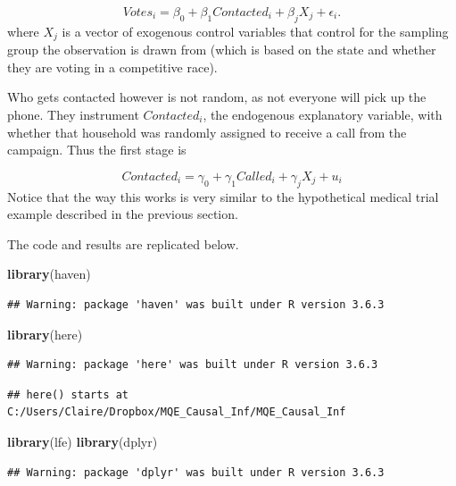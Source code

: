\documentclass[
]{article}
\newenvironment{Shaded}{\begin{snugshade}}{\end{snugshade}}
\newcommand{\KeywordTok}[1]{\textcolor[rgb]{0.13,0.29,0.53}{\textbf{#1}}}
\newcommand{\NormalTok}[1]{#1}
\begin{document}
\[
Votes_i=\beta_0+\beta_1Contacted_i+\beta_jX_j+\epsilon_i.
\] where \(X_j\) is a vector of exogenous control variables that control
for the sampling group the observation is drawn from (which is based on
the state and whether they are voting in a competitive race).

Who gets contacted however is not random, as not everyone will pick up
the phone. They instrument \(Contacted_i\), the endogenous explanatory
variable, with whether that household was randomly assigned to receive a
call from the campaign. Thus the first stage is

\[
Contacted_i=\gamma_0+\gamma_1Called_i+\gamma_jX_j+u_i
\] Notice that the way this works is very similar to the hypothetical
medical trial example described in the previous section.

The code and results are replicated below.

\begin{Shaded}
\begin{Highlighting}[]
\KeywordTok{library}\NormalTok{(haven)}
\end{Highlighting}
\end{Shaded}

\begin{verbatim}
## Warning: package 'haven' was built under R version 3.6.3
\end{verbatim}

\begin{Shaded}
\begin{Highlighting}[]
\KeywordTok{library}\NormalTok{(here)}
\end{Highlighting}
\end{Shaded}

\begin{verbatim}
## Warning: package 'here' was built under R version 3.6.3
\end{verbatim}

\begin{verbatim}
## here() starts at C:/Users/Claire/Dropbox/MQE_Causal_Inf/MQE_Causal_Inf
\end{verbatim}

\begin{Shaded}
\begin{Highlighting}[]
\KeywordTok{library}\NormalTok{(lfe)}
\KeywordTok{library}\NormalTok{(dplyr)}
\end{Highlighting}
\end{Shaded}

\begin{verbatim}
## Warning: package 'dplyr' was built under R version 3.6.3
\end{verbatim}
\end{document}
